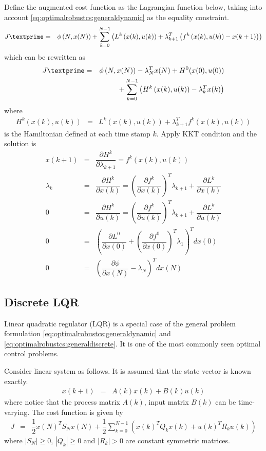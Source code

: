 Define the augmented cost function as the Lagrangian function below, taking into account \eqref{eq:optimalrobustcs:generaldynamic} as the equality constraint.
\begin{eqnarray}
	J\textprime &=& \phi\left(N, x(N)\right) + \sum_{k=0}^{N-1}\left(L^k\left(x(k), u(k)\right) + \lambda_{k+1}^T\left(f^k\left(x(k), u(k)\right) - x(k+1)\right)\right) \nonumber
\end{eqnarray}
which can be rewritten as
\begin{eqnarray}
	J\textprime &=& \phi\left(N, x(N)\right) - \lambda_N^Tx(N) + H^0(x(0), u(0)) \nonumber \\
	&& + \sum_{k=0}^{N-1}\left(H^k\left(x(k), u(k)\right) - \lambda_k^Tx(k)\right) \nonumber
\end{eqnarray}
where
\begin{eqnarray}
	H^k\left(x(k), u(k)\right) &=& L^k\left(x(k), u(k)\right) + \lambda_{k+1}^Tf^k\left(x(k), u(k)\right) \nonumber
\end{eqnarray}
is the Hamiltonian defined at each time stamp $k$. Apply KKT condition and the solution is
\begin{eqnarray}
	x(k+1) &=& \dfrac{\partial H^k}{\partial \lambda_{k+1}} = f^k\left(x(k), u(k)\right) \nonumber \\
	\lambda_k &=& \dfrac{\partial H^k}{\partial x(k)} = \left(\dfrac{\partial f^k}{\partial x(k)}\right)^T\lambda_{k+1} + \dfrac{\partial L^k}{\partial x(k)} \nonumber \\
	0 &=& \dfrac{\partial H^k}{\partial u(k)} = \left(\dfrac{\partial f^k}{\partial u(k)}\right)^T\lambda_{k+1} + \dfrac{\partial L^k}{\partial u(k)} \nonumber \\
	0 &=& \left(\dfrac{\partial L^0}{\partial x(0)} + \left(\dfrac{\partial f^0}{\partial x(0)}\right)^T\lambda_1\right)^Tdx(0) \nonumber \\
	0 &=& \left(\dfrac{\partial \phi}{\partial x(N)}-\lambda_N\right)^Tdx(N) \nonumber
\end{eqnarray}

\subsection{Discrete LQR}

Linear quadratic regulator (LQR) is a special case of the general problem formulation \eqref{eq:optimalrobustcs:generaldynamic} and \eqref{eq:optimalrobustcs:generaldiscrete}. It is one of the most commonly seen optimal control problems.

Consider linear system as follows. It is assumed that the state vector is known exactly.
\begin{eqnarray}
	x(k+1) &=& A(k)x(k) + B(k)u(k) \nonumber
\end{eqnarray}
where notice that the process matrix $A(k)$, input matrix $B(k)$ can be time-varying. The cost function is given by
\begin{eqnarray}
	J &=& \dfrac{1}{2}x(N)^TS_Nx(N) + \dfrac{1}{2}\sum_{k=0}^{N-1}\left(x(k)^TQ_kx(k) + u(k)^TR_ku(k)\right) \nonumber
\end{eqnarray}
where $|S_N|\geq 0$, $|Q_k| \geq 0$ and $|R_k| >0$ are constant symmetric matrices.

